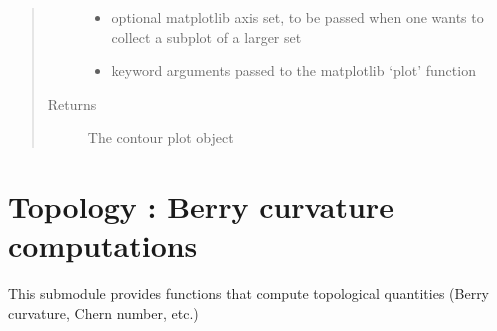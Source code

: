 \documentclass[letterpaper,10pt,english]{sphinxmanual}
\begin{document}
\begin{fulllineitems}
\begin{quote}
\begin{description}
\begin{itemize}
\item {} 
\sphinxAtStartPar
{} \textendash{} optional matplotlib axis set, to be passed when one wants to collect a subplot of a larger set

\item {} 
\sphinxAtStartPar
{} \textendash{} keyword arguments passed to the matplotlib ‘plot’ function

\end{itemize}

\item[{Returns}] \leavevmode
\sphinxAtStartPar
The contour plot object

\end{description}\end{quote}

\end{fulllineitems}



\chapter{Topology : Berry curvature computations}
\label{\detokenize{berry:topology-berry-curvature-computations}}\label{\detokenize{berry::doc}}
\sphinxAtStartPar
This submodule provides functions that compute topological quantities (Berry curvature, Chern number, etc.)

\label{\detokenize{berry:module-pyqcm.berry}}
\end{document}
